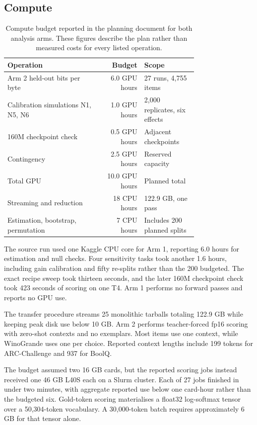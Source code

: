 \subsection{Compute}
\begin{table}[htbp]
\centering\small
\caption{Compute budget reported in the planning document for both analysis arms. These figures describe the plan rather than measured costs for every listed operation.}
\label{tab:original15}
\begin{tabular}{p{0.48\linewidth}rp{0.28\linewidth}}\hline
Operation & Budget & Scope\\\hline
Arm 2 held-out bits per byte & 6.0 GPU hours & 27 runs, 4,755 items\\
Calibration simulations N1, N5, N6 & 1.0 GPU hours & 2,000 replicates, six effects\\
160M checkpoint check & 0.5 GPU hours & Adjacent checkpoints\\
Contingency & 2.5 GPU hours & Reserved capacity\\
Total GPU & 10.0 GPU hours & Planned total\\
Streaming and reduction & 18 CPU hours & 122.9 GB, one pass\\
Estimation, bootstrap, permutation & 7 CPU hours & Includes 200 planned splits\\\hline
\end{tabular}
\end{table}

The source run used one Kaggle CPU core for Arm 1, reporting 6.0 hours for estimation and null checks. Four sensitivity tasks took another 1.6 hours, including gain calibration and fifty re-splits rather than the 200 budgeted. The exact recipe sweep took thirteen seconds, and the later 160M checkpoint check took 423 seconds of scoring on one T4. Arm 1 performs no forward passes and reports no GPU use.

The transfer procedure streams 25 monolithic tarballs totaling 122.9 GB while keeping peak disk use below 10 GB. Arm 2 performs teacher-forced fp16 scoring with zero-shot contexts and no exemplars. Most items use one context, while WinoGrande uses one per choice. Reported context lengths include 199 tokens for ARC-Challenge and 937 for BoolQ.

The budget assumed two 16 GB cards, but the reported scoring jobs instead received one 46 GB L40S each on a Slurm cluster. Each of 27 jobs finished in under two minutes, with aggregate reported use below one card-hour rather than the budgeted six. Gold-token scoring materialises a float32 log-softmax tensor over a 50,304-token vocabulary. A 30,000-token batch requires approximately 6 GB for that tensor alone.

